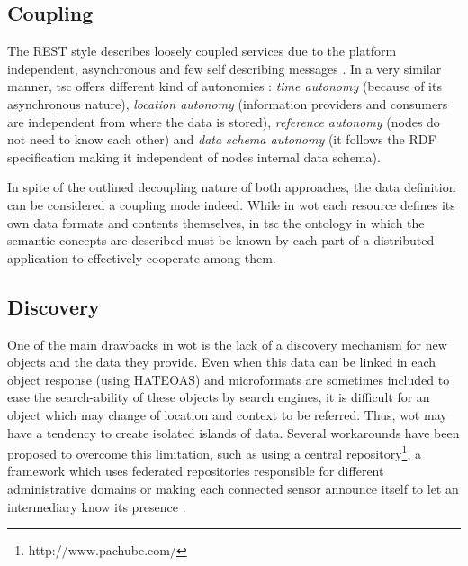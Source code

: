 \subsection{Coupling}
\label{sec:coupling}
The REST style describes loosely coupled services due to the platform independent, asynchronous and few self describing messages
\citep{pautasso_why_2009}. In a very similar manner, \ac{tsc} offers different kind of autonomies \citep{krummenacher_www_2005}:
\textit{time autonomy} (because of its asynchronous nature), \textit{location autonomy} (information providers and consumers are independent
from where the data is stored), \textit{reference autonomy} (nodes do not need to know each other) and
\textit{data schema autonomy} (it follows the RDF specification making it independent of nodes internal data schema).

In spite of the outlined decoupling nature of both approaches, the data definition can be considered a coupling mode indeed.
While in \ac{wot} each resource defines its own data formats and contents themselves, in \ac{tsc} the ontology in which the semantic
concepts are described must be known by each part of a distributed application to effectively cooperate among them.

\subsection{Discovery}
One of the main drawbacks in \ac{wot} is the lack of a discovery mechanism for new objects and the data they provide. Even when this data can be linked
in each object response (using HATEOAS) and microformats are sometimes included to ease the search-ability of these objects by search engines, it is difficult for an
object which may change of location and context to be referred. Thus, \ac{wot} may have a tendency to create isolated islands of data. Several workarounds
have been proposed to overcome this limitation, such as using a central repository\footnote{http://www.pachube.com/}, a framework which uses federated
repositories responsible for different administrative domains \citep{stirbu_towards_2008} or making each connected sensor announce itself to let an
intermediary know its presence \citep{kamilaris_smart_2010}.

